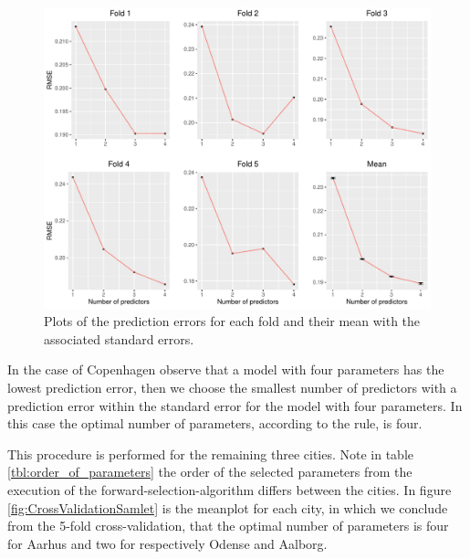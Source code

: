     \begin{figure}[H]
        \centering
      \includegraphics[width = 1 \textwidth]{figures/Nanna/CrossValidationCopenhagen.pdf}
      \caption{Plots of the prediction errors for each fold and their mean with the associated standard errors.}
      \label{fig:CrossValidationCopenhagen}
    \end{figure}
    
In the case of Copenhagen observe that a model with four parameters has the lowest prediction error, then we choose the smallest number of predictors with a prediction error within the standard error for the model with four parameters.
In this case the optimal number of parameters, according to the rule, is four.

This procedure is performed for the remaining three cities. Note in table \ref{tbl:order_of_parameters} the order of the selected parameters from the execution of the forward-selection-algorithm differs between the cities. 
In figure \ref{fig:CrossValidationSamlet} is the meanplot for each city, in which we conclude from the 5-fold cross-validation, that the optimal number of parameters is four for Aarhus and two for respectively Odense and Aalborg.

